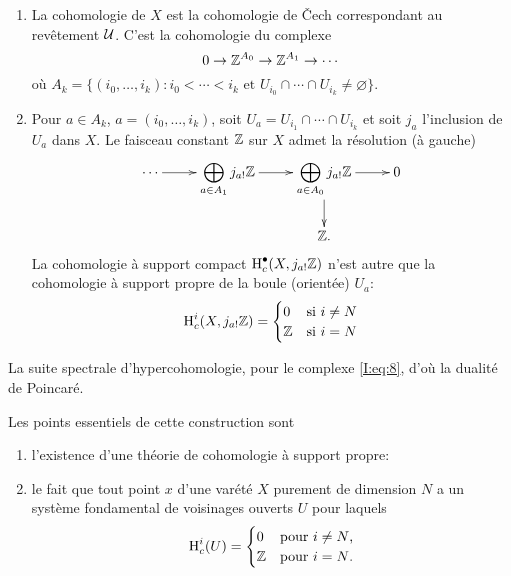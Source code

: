 \documentclass[oneside]{book}
\begin{document}
\begin{enumerate}[\indent A]
  \item La cohomologie de $X$ est la cohomologie de \v Cech correspondant au 
    revêtement $\mathcal{U}$. C'est la cohomologie du complexe 
    \begin{equation}\label{I:eq:8}
      0 \to \mathbb{Z}^{A_0} \to \mathbb{Z}^{A_1} \to \cdots
    \end{equation}
    où $A_k=\{(i_0,\dotsc,i_k) : i_0<\cdots<i_k\text{ et } U_{i_0}\cap \cdots \cap U_{i_k} \ne \varnothing\}$. 
    \item Pour $a\in A_k$, $a=(i_0,\dotsc,i_k)$, soit 
      $U_a=U_{i_1}\cap \cdots \cap U_{i_k}$ et soit $j_a$ l'inclusion de $U_a$ 
      dans $X$. Le faisceau constant $\mathbb{Z}$ sur $X$ admet la résolution (à 
      gauche) 
      \begin{equation}\label{I:eq:9}
      \xymatrix{
        \cdots \ar[r]
          & \displaystyle\bigoplus_{a\in A_1} j_{a!}\dZ \ar[r] 
          & \displaystyle\bigoplus_{a\in A_0} j_{a!} \dZ \ar[r] \ar[d] 
          & 0 \\
        & & \dZ \text{.}
      }
      \end{equation}
      La cohomologie à support compact $\operatorname{H}_c^\bullet(X,j_{a!}\mathbb{Z})$ n'est autre 
      que la cohomologie à support propre de la boule (orientée) $U_a$: 
        \[
          \operatorname{H}_c^i(X,j_{a!}\mathbb{Z}) = \begin{cases}
                                  0   & \text{si $i\ne N$} \\
                                  \mathbb{Z} & \text{si $i = N$}
                                \end{cases}
        \]
\end{enumerate}

La suite spectrale d'hypercohomologie, pour le complexe \eqref{I:eq:8}, d'où 
la dualité de Poincaré. 

Les points essentiels de cette construction sont 
\begin{enumerate}[\indent a)]
  \item l'existence d'une théorie de cohomologie à support propre: 
  \item le fait que tout point $x$ d'une varété $X$ purement de dimension 
    $N$ a un système fondamental de voisinages ouverts $U$ pour laquels 
    \begin{equation}\label{I:eq:10}
      \operatorname{H}_c^i(U) = \begin{cases}
                    0   & \text{pour $i\ne N$,} \\
                    \mathbb{Z} & \text{pour $i=N$.}
                  \end{cases}
    \end{equation}
\end{enumerate}
\end{document}
